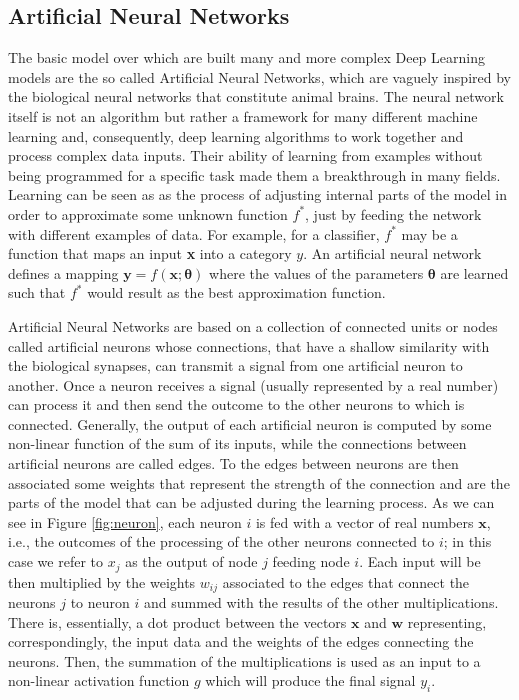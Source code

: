 \subsection{Artificial Neural Networks}
The basic model over which are built many and more complex Deep Learning models are the so called Artificial Neural Networks, which are vaguely inspired by the biological neural networks that constitute animal brains. The neural network itself is not an algorithm but rather a framework for many different machine learning and, consequently, deep learning algorithms to work together and process complex data inputs. Their ability of learning from examples without being programmed for a specific task made them a breakthrough in many fields. Learning can be seen as as the process of adjusting internal parts of the model in order to approximate some unknown function \(f^*\), just by feeding the network with different examples of data. For example, for a classifier, \(f^*\) may be a function that maps an input \textbf{x} into a category \(y\). An artificial neural network defines a mapping \(\textbf{y} = f(\textbf{x};\boldsymbol{\theta}) \) where the values of the parameters $\boldsymbol{\theta}$ are learned such that \(f^*\) would result as the best approximation function. 

Artificial Neural Networks are based on a collection of connected units or nodes called artificial neurons whose connections, that have a shallow similarity with the biological synapses, can transmit a signal from one artificial neuron to another. Once a neuron receives a signal (usually represented by a real number) can process it and then send the outcome to the other neurons to which is connected. Generally, the output of each artificial neuron is computed by some non-linear function of the sum of its inputs, while the connections between artificial neurons are called edges. To the edges between neurons are then associated some weights that represent the strength of the connection and are the parts of the model that can be adjusted during the learning process. As we can see in Figure \ref{fig:neuron}, each  neuron \(i\) is fed with a vector of real numbers \(\textbf{x}\), i.e., the outcomes of the processing of the other neurons connected to \(i\); in this case we refer to \(x_j\) as the output of node \(j\) feeding node \(i\). Each input will be then multiplied by the weights $w_{ij}$ associated to the edges that connect the neurons \(j\) to neuron \(i\) and summed with the results of the other multiplications. There is, essentially, a dot product between the vectors \(\textbf{x}\) and \(\textbf{w}\) representing, correspondingly, the input data and the weights of the edges connecting the neurons. Then, the summation of the multiplications is used as an input to a non-linear activation function \(g\) which will produce the final signal \(y_i\). 

